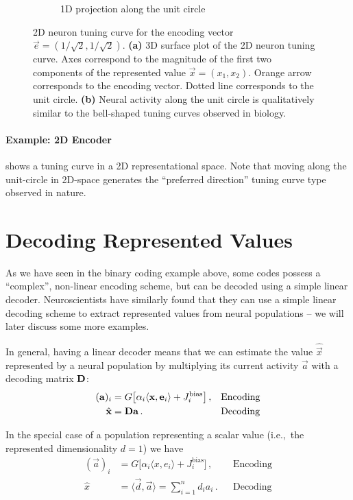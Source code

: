 \documentclass[10pt,letterpaper,oneside]{article}
\begin{document}
\begin{figure}
\begin{subfigure}{0.5\textwidth}
		\caption{1D projection along the unit circle}
		\label{fig:2d_encoder_tuning_curve_unit}
	\end{subfigure}
	\caption{2D neuron tuning curve for the encoding vector $\vec e = (1/\sqrt{2}, 1/\sqrt{2})$. \textbf{(a)} 3D surface plot of the 2D neuron tuning curve. Axes correspond to the magnitude of the first two components of the represented value $\vec x = (x_1, x_2)$. Orange arrow corresponds to the encoding vector. Dotted line corresponds to the unit circle. \textbf{(b)} Neural activity along the unit circle is qualitatively similar to the bell-shaped tuning curves observed in biology. }
\end{figure}

\paragraph{Example: 2D Encoder}
 shows a tuning curve in a 2D representational space. Note that moving along the unit-circle in 2D-space generates the \enquote{preferred direction} tuning curve type observed in nature.

\section{Decoding Represented Values}

As we have seen in the binary coding example above, some codes possess a \enquote{complex}, non-linear encoding scheme, but can be decoded using a simple linear decoder. Neuroscientists have similarly found that they can use a simple linear decoding scheme to extract represented values from neural populations -- we will later discuss some more examples.

In general, having a linear decoder means that we can estimate the value $\hat{\vec x}$ represented by a neural population by multiplying its current activity $\vec a$ with a decoding matrix ${\mathbf{D}}$:
\begin{align*}
	({\mathbf{a}})_i &=
		G\big[\alpha_i \langle {\mathbf{x}}, {\mathbf{e}}_i \rangle + J^\mathrm{bias}_i\big] \,, && \text{Encoding} \\
	\hat{{\mathbf{x}}} &= {\mathbf{D}} {\mathbf{a}} \,. && \text{Decoding}
\end{align*}

In the special case of a population representing a scalar value (i.e.,~the represented dimensionality $d = 1$) we have
\begin{align*}
(\vec a)_i &=
G\big[\alpha_i \langle x, e_i \rangle + J^\mathrm{bias}_i\big] \,, && \text{Encoding} \\
\hat{x} &= \langle \vec d, \vec a \rangle = \sum_{i = 1}^n d_i a_i \,. && \text{Decoding}
\end{align*}
\end{document}
